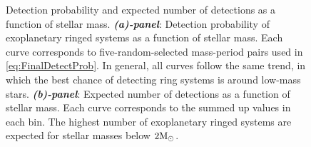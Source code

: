 \begin{figure}[!ht]%
    \centering
    \qquad
    \caption{\scriptsize{Detection probability and expected number of detections as a function of stellar mass. \textit{\textbf{(a)-panel}}: Detection probability of exoplanetary ringed systems as a function of stellar mass. Each curve corresponds to five-random-selected mass-period pairs used in \autoref{eq:FinalDetectProb}. In general, all curves follow the same trend, in which the best chance of detecting ring systems is around low-mass stars. \textit{\textbf{(b)-panel}}: Expected number of detections as a function of stellar mass. Each curve corresponds to the summed up values in each bin. The highest number of exoplanetary ringed systems are expected for stellar masses below $2 \textnormal{M}_\odot$.}}%
    \label{fig:MonteKroupaNielsen}%
\end{figure}

